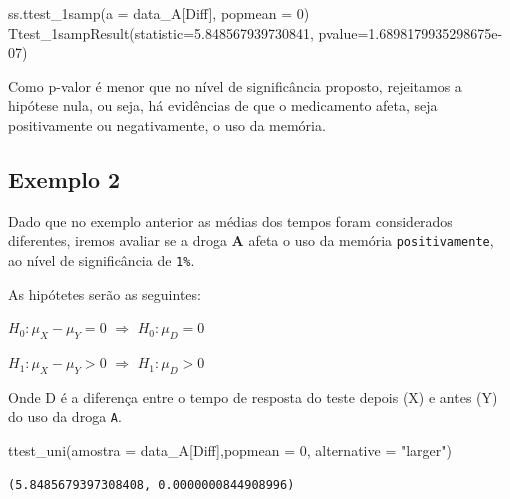\documentclass[
  letterpaper,
  DIV=11,
  numbers=noendperiod]{scrreprt}
\newenvironment{Shaded}{\begin{snugshade}}{\end{snugshade}}
\newcommand{\DecValTok}[1]{\textcolor[rgb]{0.68,0.00,0.00}{#1}}
\newcommand{\FloatTok}[1]{\textcolor[rgb]{0.68,0.00,0.00}{#1}}
\newcommand{\NormalTok}[1]{\textcolor[rgb]{0.00,0.23,0.31}{#1}}
\newcommand{\OperatorTok}[1]{\textcolor[rgb]{0.37,0.37,0.37}{#1}}
\newcommand{\StringTok}[1]{\textcolor[rgb]{0.13,0.47,0.30}{#1}}
\begin{document}
\begin{Shaded}
\begin{Highlighting}[]
\NormalTok{ss.ttest\_1samp(a }\OperatorTok{=}\NormalTok{ data\_A[}\StringTok{\textquotesingle{}Diff\textquotesingle{}}\NormalTok{], popmean }\OperatorTok{=}  \DecValTok{0}\NormalTok{)}
\NormalTok{Ttest\_1sampResult(statistic}\OperatorTok{=}\FloatTok{5.848567939730841}\NormalTok{, pvalue}\OperatorTok{=}\FloatTok{1.6898179935298675e{-}07}\NormalTok{)}
\end{Highlighting}
\end{Shaded}

Como p-valor é menor que no nível de significância proposto, rejeitamos
a hipótese nula, ou seja, há evidências de que o medicamento afeta, seja
positivamente ou negativamente, o uso da memória.

\hypertarget{exemplo-2-5}{%
\subsection{Exemplo 2}\label{exemplo-2-5}}

Dado que no exemplo anterior as médias dos tempos foram considerados
diferentes, iremos avaliar se a droga \textbf{A} afeta o uso da memória
\texttt{positivamente}, ao nível de significância de \texttt{1\%}.

As hipótetes serão as seguintes:

\(H_{0} : \mu_{X} - \mu_{Y} = 0\) \(\Rightarrow\)
\(H_{0} : \mu_{D} = 0\)

\(H_{1} : \mu_{X} - \mu_{Y} > 0\) \(\Rightarrow\)
\(H_{1} : \mu_{D} > 0\)

Onde D é a diferença entre o tempo de resposta do teste depois (X) e
antes (Y) do uso da droga \texttt{A}.

\begin{Shaded}
\begin{Highlighting}[]
\NormalTok{ttest\_uni(amostra }\OperatorTok{=}\NormalTok{ data\_A[}\StringTok{\textquotesingle{}Diff\textquotesingle{}}\NormalTok{],popmean }\OperatorTok{=} \DecValTok{0}\NormalTok{, alternative }\OperatorTok{=} \StringTok{"larger"}\NormalTok{)}
\end{Highlighting}
\end{Shaded}

\begin{tcolorbox}[enhanced jigsaw, breakable, leftrule=.75mm, left=2mm, opacityback=0, bottomrule=.15mm, toprule=.15mm, rightrule=.15mm, arc=.35mm, colback=white]

\begin{verbatim}
(5.8485679397308408, 0.0000000844908996)
\end{verbatim}

\end{tcolorbox}
\end{document}
